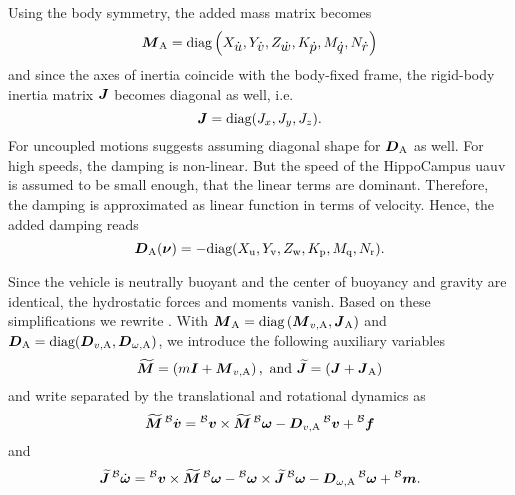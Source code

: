 Using the body symmetry, the added mass matrix becomes 
\begin{equation}
	\mbox{$\bm{M}$}_\text{A} =
	\text{diag}\left(X_{\mbox{$\dot{u}$}}, Y_{\mbox{$\dot{v}$}}, Z_{\mbox{$\dot{w}$}}, K_{\mbox{$\dot{p}$}}, M_{\mbox{$\dot{q}$}}, N_{\mbox{$\dot{r}$}}\right)
\end{equation}
and since the axes of inertia coincide with the body-fixed frame, the rigid-body inertia matrix $\mbox{$\bm{J}$}$ becomes diagonal as well, i.e.
\begin{equation}
	\mbox{$\bm{J}$} = \text{diag}(J_x, J_y, J_z)
	.
\end{equation}
For uncoupled motions \cite{Fossen11} suggests assuming diagonal shape for $\mbox{$\bm{D}$}_\text{A}$ as well. For high speeds, the damping is non-linear. But the speed of the HippoCampus \ac{uauv} is assumed to be small enough, that the linear terms are dominant. Therefore, the damping is approximated as linear function in terms of velocity.
Hence, the added damping reads
\begin{equation}
	\mbox{$\bm{D}$}_\text{A}(\mbox{$\bm{\nu}$}) = -\text{diag}(X_\text{u}, Y_\text{v}, Z_\text{w}, K_\text{p}, M_\text{q}, N_\text{r})
	.
\end{equation}

Since the vehicle is neutrally buoyant and the center of buoyancy and gravity are identical, the hydrostatic forces and moments vanish. Based on these simplifications we rewrite . With $\mbox{$\bm{M}$}_\text{A} = \text{diag}\left(\mbox{$\bm{M}$}_{v, \text{A}}, \mbox{$\bm{J}$}_\text{A}\right)$ and $\mbox{$\bm{D}$}_\text{A} = \text{diag}(\mbox{$\bm{D}$}_{v,\text{A}}, \mbox{$\bm{D}$}_{\omega,\text{A}})$, we introduce the following auxiliary variables
\begin{equation}
	\mbox{$\widetilde{\bm{M}}$} = \left(m\mbox{$\bm{I}$} + \mbox{$\bm{M}$}_{v, \text{A}}\right),\text{ and }
	\mbox{$\widetilde{\bm{J}}$} = \left(\mbox{$\bm{J}$} + \mbox{$\bm{J}$}_\text{A}\right)
\end{equation}
and write  separated by the translational and rotational dynamics as
\begin{equation}
	\label{eq:equation-of-motion-translational}
	\Mbs \vlinbodydot =
	\vlinbody \times \Mbs \vangbody
	-\Dvadded \vlinbody
	+ \prescript{\mathcal{B}}{}{\fb}
\end{equation}
and
\begin{equation}
	\label{eq:equation-of-motion-rotational}
	\Jbs \vangbodydot =
	\vlinbody \times \Mbs \vangbody
	- \vangbody \times \Jbs \vangbody
	- \Domegaadded \vangbody
	+ \prescript{\mathcal{B}}{}{\mb}
	.
\end{equation}

